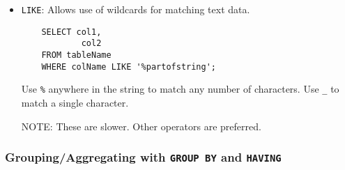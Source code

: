 \documentclass[12pt]{article}
\theoremstyle{plain}
\theoremstyle{definition}
\theoremstyle{remark}
\begin{document}
\begin{itemize}
  \item
    \texttt{LIKE}:
    Allows use of wildcards for matching text data.
    \begin{lstlisting}
    SELECT col1,
            col2
    FROM tableName
    WHERE colName LIKE '%partofstring';
    \end{lstlisting}
    Use \texttt{\%} anywhere in the string to match any number of
    characters.
    Use \texttt{\_} to match a single character.

    NOTE: These are slower. Other operators are preferred.
\end{itemize}



\subsubsection{%
  Grouping/Aggregating with \texttt{GROUP BY} and \texttt{HAVING}
}
\end{document}
